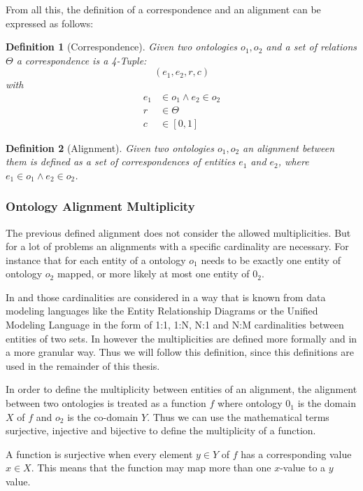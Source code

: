 \documentclass[11pt,titlepage,oneside,openany,a4paper]{report}
\newtheorem{definition}{Definition}[chapter]
\begin{document}
From all this, the definition of a correspondence and an alignment can be expressed as follows:
\begin{definition} [Correspondence] Given two ontologies $o_1,o_2$ and a set of relations $\Theta$ a correspondence is a 4-Tuple:
	\begin{equation*}
	(e_1,e_2,r,c)
	\end{equation*}
with
	\begin{eqnarray*}
	e_1 & \in o_1 \wedge  e_2 \in o_2 \\
	r & \in \Theta \\
	c & \in [0,1]
	\end{eqnarray*}
\end{definition}
\begin{definition} [Alignment] Given two ontologies $o_1, o_2$ an alignment between them is defined as a set of correspondences of entities $e_1$ and $e_2$, where $e_1 \in o_1 \wedge e_2 \in o_2$.
\end{definition}

\subsubsection{Ontology Alignment Multiplicity}
\label{sec:oa_multiplicity}
The previous defined alignment does not consider the allowed multiplicities. But for a lot of problems an alignments with a specific cardinality are necessary. For instance that for each entity of a ontology $o_1$ needs to be exactly one entity of ontology $o_2$ mapped, or more likely at most one entity of $0_2$.

In \cite{Rahm:2001} and \cite{ehrig2006ontology} those cardinalities are considered in a way that is known from data modeling languages like the Entity Relationship Diagrams or the Unified Modeling Language in the form of 1:1, 1:N, N:1 and N:M cardinalities between entities of two sets. In \cite{euzenat2013d} however the multiplicities are defined more formally and in a more granular way. Thus we will follow this definition, since this definitions are used in the remainder of this thesis.

In order to define the multiplicity between entities of an alignment, the alignment between two ontologies is treated as a function $f$ where ontology $0_1$ is the domain $X$ of $f$ and $o_2$ is the co-domain $Y$. Thus we can use the mathematical terms surjective, injective and bijective to define the multiplicity of a function.

A function is surjective when every element $y \in Y$ of $f$ has a corresponding value $x \in X$. This means that the function may map more than one $x$-value to a $y$ value.
\end{document}
